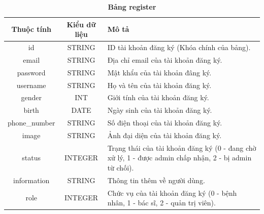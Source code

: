 \begin{table}[H]
  \caption{\bfseries \fontsize{12pt}{0pt}\selectfont Bảng register}
  \centering
  \begin{tabularx}{0.9\textwidth}{|c|c|X|}
    \hline
    \textbf{Thuộc tính} & \textbf{Kiểu dữ liệu} & \textbf{Mô tả} \\
    \hline
    id & STRING & ID tài khoản đăng ký (Khóa chính của bảng). \\
    \hline
    email & STRING & Địa chỉ email của tài khoản đăng ký. \\
    \hline
    password & STRING & Mật khẩu của tài khoản đâng ký. \\
    \hline
    username & STRING & Họ và tên của tài khoản đăng ký. \\
    \hline
    gender & INT & Giới tính của tài khoản đăng ký. \\
    \hline
    birth & DATE & Ngày sinh của tài khoản đăng ký. \\
    \hline
    phone\_number & STRING & Số điện thoại của tài khoản đăng ký. \\
    \hline
    image & STRING & Ảnh đại diện của tài khoản đăng ký. \\
    \hline
    status & INTEGER & Trạng thái của tài khoản đăng ký (0 - đang chờ xử lý, 1 - được admin chấp nhận, 2 - bị admin từ chối). \\
    \hline
    information & STRING & Thông tin thêm về người dùng. \\
    \hline
    role & INTEGER & Chức vụ của tài khoản đăng ký (0 - bệnh nhân, 1 - bác sĩ, 2 - quản trị viên).\\
    \hline
  \end{tabularx}
\end{table}

